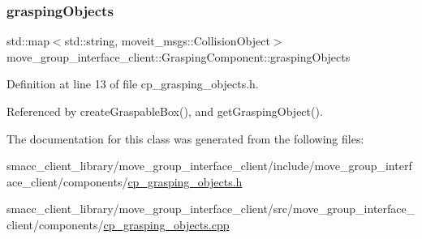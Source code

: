 \subsubsection{\texorpdfstring{grasping\+Objects}{graspingObjects}}
{\footnotesize\ttfamily std\+::map$<$std\+::string, moveit\+\_\+msgs\+::\+Collision\+Object$>$ move\+\_\+group\+\_\+interface\+\_\+client\+::\+Grasping\+Component\+::grasping\+Objects\hspace{0.3cm}{\ttfamily [private]}}



Definition at line 13 of file cp\+\_\+grasping\+\_\+objects.\+h.



Referenced by create\+Graspable\+Box(), and get\+Grasping\+Object().



The documentation for this class was generated from the following files\+:\begin{DoxyCompactItemize}
\item 
smacc\+\_\+client\+\_\+library/move\+\_\+group\+\_\+interface\+\_\+client/include/move\+\_\+group\+\_\+interface\+\_\+client/components/\hyperlink{cp__grasping__objects_8h}{cp\+\_\+grasping\+\_\+objects.\+h}\item 
smacc\+\_\+client\+\_\+library/move\+\_\+group\+\_\+interface\+\_\+client/src/move\+\_\+group\+\_\+interface\+\_\+client/components/\hyperlink{cp__grasping__objects_8cpp}{cp\+\_\+grasping\+\_\+objects.\+cpp}\end{DoxyCompactItemize}
